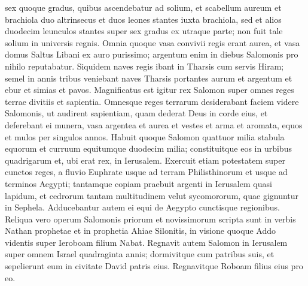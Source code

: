 \begin{biblechapter}
\begin{biblechapter}
\begin{biblechapter}
\begin{biblechapter}
\begin{biblechapter}
\begin{biblechapter}
\begin{biblechapter}
\begin{biblechapter}
\begin{biblechapter}
 \verse sex quoque gradus, quibus ascendebatur ad solium, et scabellum aureum et brachiola duo altrinsecus et duos leones stantes iuxta brachiola, 
\verse sed et alios duodecim leunculos stantes super sex gradus ex utraque parte; non fuit tale solium in universis regnis.
 \verse Omnia quoque vasa convivii regis erant aurea, et vasa domus Saltus Libani ex auro purissimo; argentum enim in diebus Salomonis pro nihilo reputabatur. 
\verse Siquidem naves regis ibant in Tharsis cum servis Hiram; semel in annis tribus veniebant naves Tharsis portantes aurum et argentum et ebur et simias et pavos.
 \verse Magnificatus est igitur rex Salomon super omnes reges terrae divitiis et sapientia. 
\verse Omnesque reges terrarum desiderabant faciem videre Salomonis, ut audirent sapientiam, quam dederat Deus in corde eius, 
\verse et deferebant ei munera, vasa argentea et aurea et vestes et arma et aromata, equos et mulos per singulos annos. 
\verse Habuit quoque Salomon quattuor milia stabula equorum et curruum equitumque duodecim milia; constituitque eos in urbibus quadrigarum et, ubi erat rex, in Ierusalem. 
\verse Exercuit etiam potestatem super cunctos reges, a fluvio Euphrate usque ad terram Philisthinorum et usque ad terminos Aegypti; 
\verse tantamque copiam praebuit argenti in Ierusalem quasi lapidum, et cedrorum tantam multitudinem velut sycomororum, quae gignuntur in Sephela. 
 \verse Adducebantur autem ei equi de Aegypto cunctisque regionibus.
 \verse Reliqua vero operum Salomonis priorum et novissimorum scripta sunt in verbis Nathan prophetae et in prophetia Ahiae Silonitis, in visione quoque Addo videntis super Ieroboam filium Nabat.
 \verse Regnavit autem Salomon in Ierusalem super omnem Israel quadraginta annis; 
 \verse dormivitque cum patribus suis, et sepelierunt eum in civitate David patris eius. Regnavitque Roboam filius eius pro eo.
 

\end{biblechapter}
\end{biblechapter}
\end{biblechapter}
\end{biblechapter}
\end{biblechapter}
\end{biblechapter}
\end{biblechapter}
\end{biblechapter}
\end{biblechapter}
